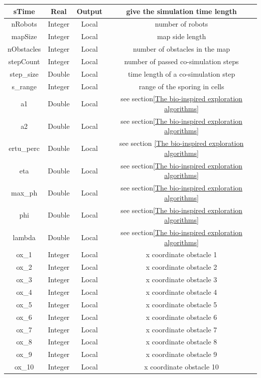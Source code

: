 \documentclass[english]{article}
\begin{document}
\begin{longtable}{|c|c|c|c|}
	sTime & Real & Output & give the simulation time length\\ \hline
	nRobots & Integer & Local & number of robots\\ \hline
	mapSize & Integer & Local & map side length \\ \hline 
	nObstacles & Integer & Local & number of obstacles in the map \\ \hline
	stepCount & Integer & Local & number of passed co-simulation steps \\ \hline
	step\_size & Double & Local & time length of a co-simulation step \\ \hline
	s\_range & Integer & Local & range of the sporing in cells \\ \hline
	a1 & Double & Local & see section\ref{The bio-inspired exploration algorithms} \\ \hline
	a2 & Double & Local & see section\ref{The bio-inspired exploration algorithms} \\ \hline
	ertu\_perc & Double & Local & see section \ref{The bio-inspired exploration algorithms} \\ \hline
	eta & Double & Local & see section\ref{The bio-inspired exploration algorithms} \\ \hline
	max\_ph & Double & Local & see section\ref{The bio-inspired exploration algorithms} \\ \hline
	phi & Double & Local & see section\ref{The bio-inspired exploration algorithms} \\ \hline
	lambda & Double & Local & see section\ref{The bio-inspired exploration algorithms} \\ \hline
	ox\_1 & Integer & Local & x coordinate obstacle 1 \\ \hline
	ox\_2 & Integer & Local & x coordinate obstacle 2 \\ \hline
	ox\_3 & Integer & Local & x coordinate obstacle 3 \\ \hline
	ox\_4 & Integer & Local & x coordinate obstacle 4 \\ \hline
	ox\_5 & Integer & Local & x coordinate obstacle 5 \\ \hline
	ox\_6 & Integer & Local & x coordinate obstacle 6 \\ \hline
	ox\_7 & Integer & Local & x coordinate obstacle 7 \\ \hline
	ox\_8 & Integer & Local & x coordinate obstacle 8 \\ \hline
	ox\_9 & Integer & Local & x coordinate obstacle 9 \\ \hline
	ox\_10 & Integer & Local & x coordinate obstacle 10 \\ \hline

\end{longtable}
\end{document}
